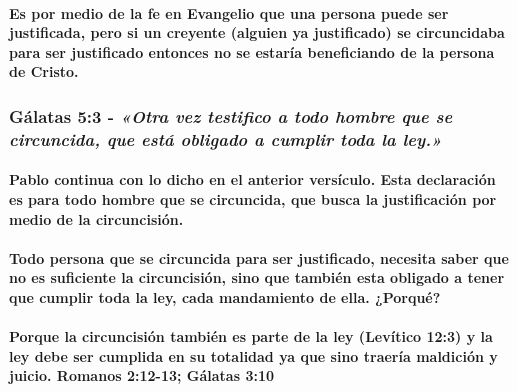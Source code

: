 \documentclass[11a pt,twoside]{article}
\newcommand{\scripture}[1]{%
  {\fontsize{12pt}{16pt}\selectfont\ScriptureFont\itshape #1}%
}
\def\textbf#1{#1}%
\let\oldsubsubsection\subsubsection
\renewcommand{\subsubsection}{\needspace{4\baselineskip}\oldsubsubsection}
\let\oldparagraph\paragraph
\renewcommand{\paragraph}{\needspace{3\baselineskip}\oldparagraph}
\begin{document}
\paragraph{Es por medio de la fe en Evangelio que una persona puede ser
justificada, pero si un creyente (alguien ya justificado) se
circuncidaba para ser justificado entonces no se estaría beneficiando de
la persona de
Cristo.}\label{es-por-medio-de-la-fe-en-evangelio-que-una-persona-puede-ser-justificada-pero-si-un-creyente-alguien-ya-justificado-se-circuncidaba-para-ser-justificado-entonces-no-se-estaruxeda-beneficiando-de-la-persona-de-cristo.}

\subsubsection{\texorpdfstring{Gálatas 5:3 -
\scripture{«Otra vez testifico a todo hombre que se circuncida, que está obligado a cumplir toda la ley.»}}{Gálatas 5:3 - }}\label{guxe1latas-53---otra-vez-testifico-a-todo-hombre-que-se-circuncida-que-estuxe1-obligado-a-cumplir-toda-la-ley.}

\paragraph{Pablo continua con lo dicho en el anterior versículo. Esta
declaración es para todo hombre que se circuncida, que busca la
justificación por medio de la
circuncisión.}\label{pablo-continua-con-lo-dicho-en-el-anterior-versuxedculo.-esta-declaraciuxf3n-es-para-todo-hombre-que-se-circuncida-que-busca-la-justificaciuxf3n-por-medio-de-la-circuncisiuxf3n.}

\paragraph{\texorpdfstring{Todo persona que se circuncida para ser
justificado, necesita saber que no es suficiente la circuncisión, sino
que también esta obligado a tener que cumplir \textbf{toda} la ley, cada
mandamiento de ella.
¿Porqué?}{Todo persona que se circuncida para ser justificado, necesita saber que no es suficiente la circuncisión, sino que también esta obligado a tener que cumplir toda la ley, cada mandamiento de ella. ¿Porqué?}}\label{todo-persona-que-se-circuncida-para-ser-justificado-necesita-saber-que-no-es-suficiente-la-circuncisiuxf3n-sino-que-tambiuxe9n-esta-obligado-a-tener-que-cumplir-toda-la-ley-cada-mandamiento-de-ella.-porquuxe9}

\paragraph{Porque la circuncisión también es parte de la ley (Levítico
12:3) y la ley debe ser cumplida en su totalidad ya que sino traería
maldición y juicio. Romanos 2:12-13; Gálatas
3:10}\label{porque-la-circuncisiuxf3n-tambiuxe9n-es-parte-de-la-ley-levuxedtico-123-y-la-ley-debe-ser-cumplida-en-su-totalidad-ya-que-sino-traeruxeda-maldiciuxf3n-y-juicio.-romanos-212-13-guxe1latas-310}
\end{document}

